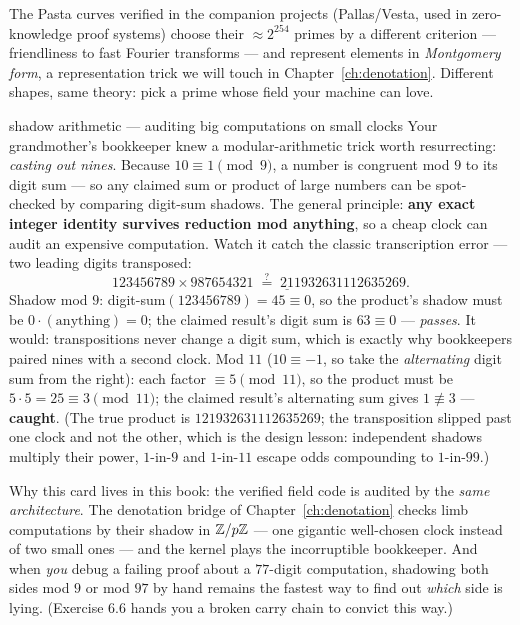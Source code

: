 The Pasta curves verified in the companion projects (Pallas/Vesta, used in
zero-knowledge proof systems) choose their $\approx 2^{254}$ primes by a
different criterion --- friendliness to fast Fourier transforms --- and
represent elements in \emph{Montgomery form}, a representation trick we will
touch in Chapter~\ref{ch:denotation}. Different shapes, same theory: pick a
prime whose field your machine can love.

\begin{worked}{shadow arithmetic --- auditing big computations on small clocks}
Your grandmother's bookkeeper knew a modular-arithmetic trick worth
resurrecting: \emph{casting out nines}. Because $10 \equiv 1 \pmod 9$,
a number is congruent mod $9$ to its digit sum --- so any claimed sum or
product of large numbers can be spot-checked by comparing digit-sum
shadows. The general principle: \textbf{any exact integer identity
survives reduction mod anything}, so a cheap clock can audit an
expensive computation. Watch it catch the classic transcription error
--- two leading digits transposed:
\[
123456789 \times 987654321 \;\overset{?}{=}\;
\underline{21}1932631112635269 .
\]
Shadow mod $9$: digit-sum$(123456789) = 45 \equiv 0$, so the product's
shadow must be $0 \cdot (\text{anything}) = 0$; the claimed result's
digit sum is $63 \equiv 0$ --- \emph{passes}. It would: transpositions
never change a digit sum, which is exactly why bookkeepers paired nines
with a second clock. Mod $11$ ($10 \equiv -1$, so take the
\emph{alternating} digit sum from the right): each factor
$\equiv 5 \pmod{11}$, so the product must be
$5 \cdot 5 = 25 \equiv 3 \pmod{11}$; the claimed result's alternating
sum gives $1 \not\equiv 3$ --- \textbf{caught}. (The true product is
$121932631112635269$; the transposition slipped past one clock and not
the other, which is the design lesson: independent shadows multiply
their power, $1$-in-$9$ and $1$-in-$11$ escape odds compounding to
$1$-in-$99$.)

Why this card lives in this book: the verified field code is audited by
the \emph{same architecture}. The denotation bridge of
Chapter~\ref{ch:denotation} checks limb computations by their shadow in
$\mathbb{Z}/p\mathbb{Z}$ --- one gigantic well-chosen clock instead of two small ones
--- and the kernel plays the incorruptible bookkeeper. And when
\emph{you} debug a failing proof about a $77$-digit computation,
shadowing both sides mod $9$ or mod $97$ by hand remains the fastest
way to find out \emph{which} side is lying. (Exercise 6.6 hands you a
broken carry chain to convict this way.)
\end{worked}

